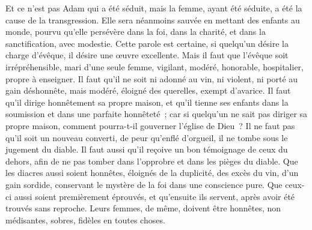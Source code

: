 \begin{multicols}{2}
Et ce n'est pas Adam qui a été séduit, mais la femme, ayant été séduite, a été la cause de la transgression.
Elle sera néanmoins sauvée en mettant des enfants au monde, pourvu qu'elle persévère dans la foi, dans la charité, et dans la sanctification, avec modestie.
\VerseOne{}Cette parole est certaine, si quelqu'un désire la charge d'évêque, il désire une œuvre excellente.
Mais il faut que l'évêque soit irrépréhensible, mari d'une seule femme, vigilant, modéré, honorable, hospitalier, propre à enseigner.
Il faut qu'il ne soit ni adonné au vin, ni violent, ni porté au gain déshonnête, mais modéré, éloigné des querelles, exempt d'avarice.
Il faut qu'il dirige honnêtement sa propre maison, et qu'il tienne ses enfants dans la soumission et dans une parfaite honnêteté~;
car si quelqu'un ne sait pas diriger sa propre maison, comment pourra-t-il gouverner l'église de Dieu~?
Il ne faut pas qu'il soit un nouveau converti, de peur qu'enflé d'orgueil, il ne tombe sous le jugement du diable.
Il faut aussi qu'il reçoive un bon témoignage de ceux du dehors, afin de ne pas tomber dans l'opprobre et dans les pièges du diable.
Que les diacres aussi soient honnêtes, éloignés de la duplicité, des excès du vin, d'un gain sordide,
conservant le mystère de la foi dans une conscience pure.
Que ceux-ci aussi soient premièrement éprouvés, et qu'ensuite ils servent, après avoir été trouvés sans reproche.
Leurs femmes, de même, doivent être honnêtes, non médisantes, sobres, fidèles en toutes choses.

\end{multicols}
